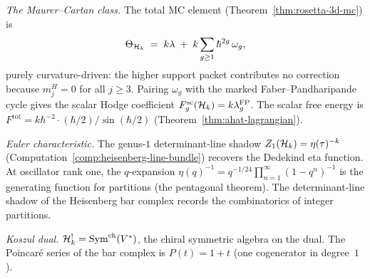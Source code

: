 \begin{computation}
\smallskip
\noindent
\emph{The Maurer--Cartan class.}
The total MC element (Theorem~\ref{thm:rosetta-3d-mc}) is
\begin{equation}\label{eq:heisenberg-hydrogen-theta}
\Theta_{\mathcal{H}_k}
\;=\;
k\lambda
\;+\;
k \sum_{g \ge 1} \hbar^{2g}\, \omega_g,
\end{equation}
purely curvature-driven: the higher support packet contributes no
correction because $m^H_j=0$ for all $j\ge3$. Pairing
$\omega_g$ with the marked Faber--Pandharipande cycle gives the
scalar Hodge coefficient
$F_g^{\mathrm{sc}}(\mathcal{H}_k)=k\lambda_g^{\mathrm{FP}}$. The scalar free energy is
$F^{\mathrm{tot}} = k\hbar^{-2}\cdot(\hbar/2)/\sin(\hbar/2)$
(Theorem~\ref{thm:ahat-lagrangian}).

\smallskip
\noindent
\emph{Euler characteristic.}
The genus-$1$ determinant-line shadow
$Z_1(\mathcal{H}_k) = \eta(\tau)^{-k}$
(Computation~\ref{comp:heisenberg-line-bundle})
recovers the Dedekind eta function. At oscillator rank one, the $q$-expansion
$\eta(q)^{-1} = q^{-1/24}\prod_{n=1}^{\infty}(1-q^n)^{-1}$
is the generating function for partitions (the
pentagonal theorem). The determinant-line shadow of the Heisenberg
bar complex records the combinatorics of integer partitions.

\smallskip
\noindent
\emph{Koszul dual.}
$\mathcal{H}_k^! = \mathrm{Sym}^{\mathrm{ch}}(V^*)$, the
chiral symmetric algebra on the dual.
The Poincar\'{e} series of the bar complex is
$P(t) = 1 + t$ (one cogenerator in degree~$1$).
\end{computation}

